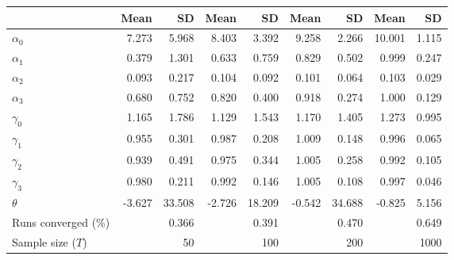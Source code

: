 
\begin{tabular}[t]{lrrrrrrrr}
\toprule
  & Mean & SD & Mean  & SD  & Mean   & SD   & Mean    & SD   \\
\midrule
$\alpha_{0}$ & 7.273 & 5.968 & 8.403 & 3.392 & 9.258 & 2.266 & 10.001 & 1.115\\
$\alpha_{1}$ & 0.379 & 1.301 & 0.633 & 0.759 & 0.829 & 0.502 & 0.999 & 0.247\\
$\alpha_{2}$ & 0.093 & 0.217 & 0.104 & 0.092 & 0.101 & 0.064 & 0.103 & 0.029\\
$\alpha_{3}$ & 0.680 & 0.752 & 0.820 & 0.400 & 0.918 & 0.274 & 1.000 & 0.129\\
$\gamma_{0}$ & 1.165 & 1.786 & 1.129 & 1.543 & 1.170 & 1.405 & 1.273 & 0.995\\
$\gamma_{1}$ & 0.955 & 0.301 & 0.987 & 0.208 & 1.009 & 0.148 & 0.996 & 0.065\\
$\gamma_{2}$ & 0.939 & 0.491 & 0.975 & 0.344 & 1.005 & 0.258 & 0.992 & 0.105\\
$\gamma_{3}$ & 0.980 & 0.211 & 0.992 & 0.146 & 1.005 & 0.108 & 0.997 & 0.046\\
$\theta$ & -3.627 & 33.508 & -2.726 & 18.209 & -0.542 & 34.688 & -0.825 & 5.156\\
Runs converged (\%) &  & 0.366 &  & 0.391 &  & 0.470 &  & 0.649\\
Sample size ($T$) &  & 50 &  & 100 &  & 200 &  & 1000\\
\bottomrule
\end{tabular}
